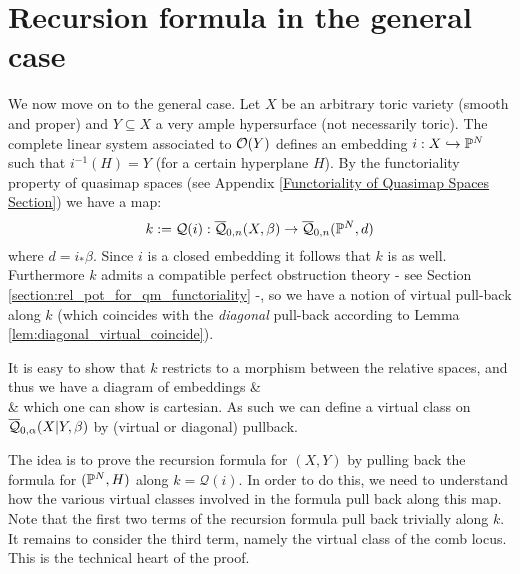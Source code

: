 \section{Recursion formula in the general case} \label{Section recursion formula in general case}

We now move on to the general case. Let $X$ be an arbitrary toric variety (smooth and proper) and $Y \subseteq X$ a very ample hypersurface (not necessarily toric). The complete linear system associated to $\mathcal{O}(Y)$ defines an embedding $i : X \hookrightarrow \mathbb P^N$ such that $i^{-1}(H) = Y$ (for a certain hyperplane $H$). By the functoriality property of quasimap spaces (see Appendix \ref{Functoriality of Quasimap Spaces Section}) we have a map:
\begin{equation*} k := \mathcal Q(i) : \overline{\mathcal Q}_{0,n}(X,\beta) \rightarrow \overline{\mathcal Q}_{0,n}(\mathbb P^N,d) \end{equation*}
where $d=i_*\beta$. Since $i$ is a closed embedding it follows that $k$ is as well. Furthermore $k$ admits a compatible perfect obstruction theory - see Section \ref{section:rel_pot_for_qm_functoriality} -, so we have a notion of virtual pull-back along $k$ (which coincides with the \emph{diagonal} pull-back according to Lemma \ref{lem:diagonal_virtual_coincide}).

It is easy to show that $k$ restricts to a morphism between the relative spaces, and thus we have a diagram of embeddings
\bcd
{} \ar[d, "f", hook] \ar[r, "g", hook]  &  \ar[d, "j", hook] \\
  \ar[r, "k", hook] & 
\ecd
which one can show is cartesian. As such we can define a virtual class on $\overline{\mathcal Q}_{0,\alpha}(X|Y,\beta)$ by (virtual or diagonal) pullback.

The idea is to prove the recursion formula for $(X,Y)$ by pulling back the formula for $(\mathbb P^N,H)$ along $k = \mathcal Q(i)$. In order to do this, we need to understand how the various virtual classes involved in the formula pull back along this map. Note that the first two terms of the recursion formula pull back trivially along $k$. It remains to consider the third term, namely the virtual class of the comb locus. This is the technical heart of the proof.

